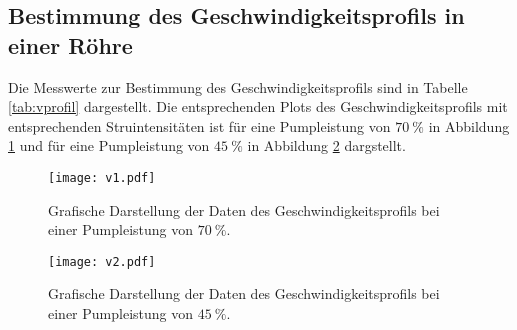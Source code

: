 \FloatBarrier
\subsection{Bestimmung des Geschwindigkeitsprofils in einer Röhre}

Die Messwerte zur Bestimmung des Geschwindigkeitsprofils sind in Tabelle \ref{tab:vprofil} dargestellt.
Die entsprechenden Plots des Geschwindigkeitsprofils mit entsprechenden Struintensitäten ist für eine Pumpleistung von $\SI{70}{\percent}$ in Abbildung \ref{fig:v1} und für eine Pumpleistung von $\SI{45}{\percent}$ in Abbildung \ref{fig:v2} dargstellt.

\begin{table}
  \centering
  \caption{Messdaten und -ergebnisse für das Geschwindigkeitsprofil des $\SI{10}{\milli\metre}$-Rohr.}
  \label{tab:vprofil}
  \noindent{}
 \end{table}

 \begin{figure}
   \centering
   \texttt{[image: v1.pdf]}
   \caption{Grafische Darstellung der Daten des Geschwindigkeitsprofils bei einer Pumpleistung von $\SI{70}{\percent}$.}
   \label{fig:v1}
 \end{figure}

 \begin{figure}
   \centering
   \texttt{[image: v2.pdf]}
   \caption{Grafische Darstellung der Daten des Geschwindigkeitsprofils bei einer Pumpleistung von $\SI{45}{\percent}$.}
   \label{fig:v2}
 \end{figure}
